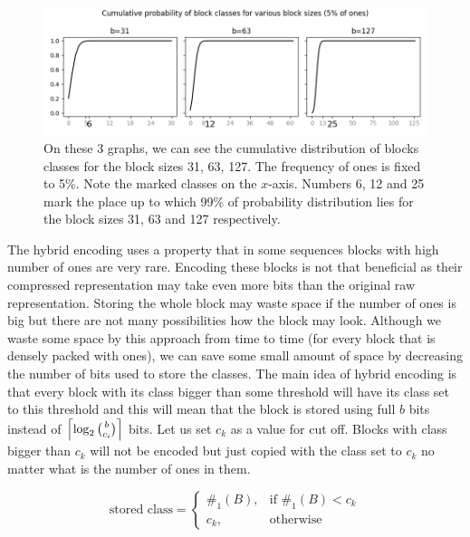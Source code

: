\begin{figure}
	\centerline{
		\includegraphics[width=\textwidth]{images/hybrid_encoding_motivation}
	}
	\caption[TODO]{On these 3 graphs, we can see the cumulative distribution
    of blocks classes for the block sizes 31, 63, 127. The frequency of ones is
    fixed to 5\%. Note the marked classes on the $x$-axis. Numbers 6, 12 and
    25 mark the place up to which 99\% of probability distribution lies for
    the block sizes 31, 63 and 127 respectively.
	}
	\label{obr:hybridEncodingDistribution}
\end{figure}

The hybrid encoding uses a property that in some sequences blocks with high number
of ones are very rare. Encoding these blocks is not that beneficial as their
compressed representation may take even more bits than the original raw
representation. Storing the whole block may waste space if the number of
ones is big but there are not many possibilities how the block may look.
Although we waste some space by this approach from time to time (for every
block that is densely packed with ones), we can save some small
amount of space by decreasing the number of bits used to store the classes.
The main idea of hybrid encoding is that every block with its
class bigger than some threshold will have its class set to this threshold
and this will mean that the block is stored using full $b$ bits instead of
$\left\lceil \log_2{b\choose c_i} \right\rceil$ bits. Let us set $c_k$ as a value for cut off.
Blocks with class bigger than $c_k$ will not be encoded but just
copied with the class set to $c_k$ no matter what is the number of ones in them.

\[
    \text{stored class} = 
\begin{cases}
    \#_1(B),& \text{if } \#_1(B) < c_k\\
    c_k,              & \text{otherwise}
\end{cases}
\]

